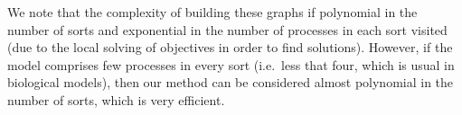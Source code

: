 \documentclass{movep}
\newcommand{\PHfrappeB}{\Rsh}
\newcommand{\PHobjectif}[2]{\mbox{$#1\PHfrappeB^*\!#2$}}
\newcommand{\PHobj}{\PHobjectif}
\def\ctx{\varsigma}
\def\PHget#1#2{{#1[#2]}}
\def\ctx{\varsigma}
\newcounter{la}
\newcommand{\ie}{i.e.\ }
\begin{document}
\begin{comment}
In order to build the GLC of the under-approximation,
we need to extend the notion of initial state $\ctx$ to a more general notion of \emph{context},
in which each sort can contain several (initially) active processes.
This allows to iteratively \emph{complete} this initial context
with all the process nodes contained in the graph.
In other words, this GLC is computed several times (until a fixed point is reached)
by adding in the initial context all the processes that are potentially new source processes
for each objective.
Indeed, if two processes of a sort $b$, say, $b_j$ and $b_k$ are needed to solve
two different objectives, %
then one has to ensure that
$b_j$ and $b_k$ are both reachable from the initial state process $\PHget{\ctx}{b}$,
but also that $b_j$ is reachable from $b_k$ and $b_k$ is reachable from $b_j$.
Thus, new objectives $\PHobj{b_j}{b_k}$ and $\PHobj{b_k}{b_j}$ are required,
which is expressed by adding $b_j$ and $b_k$ to the initial context.
Finally, the under-approximation GLC is built the same way
than the over-approximation one, but a process may be linked to several objective nodes,
and the initial context is iteratively expanded as explained.
\end{comment}

We note that the complexity of building these graphs if polynomial in the number of sorts
and exponential in the number of processes in each sort visited
(due to the local solving of objectives in order to find solutions).
However, if the model comprises few processes in every sort
(\ie less that four, which is usual in biological models),
then our method can be considered almost polynomial in the number of sorts, which is very efficient.
\end{document}

